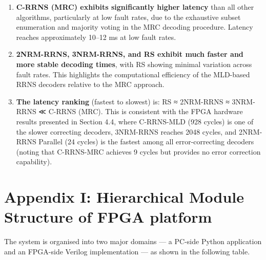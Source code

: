 \documentclass[
  english,
  12pt,
]{report}
\begin{document}
\begin{enumerate}
\def\labelenumi{\arabic{enumi}.}
\item
  \textbf{C-RRNS (MRC) exhibits significantly higher latency} than all
  other algorithms, particularly at low fault rates, due to the
  exhaustive subset enumeration and majority voting in the MRC decoding
  procedure. Latency reaches approximately 10--12 ms at low fault rates.
\item
  \textbf{2NRM-RRNS, 3NRM-RRNS, and RS exhibit much faster and more
  stable decoding times}, with RS showing minimal variation across fault
  rates. This highlights the computational efficiency of the MLD-based
  RRNS decoders relative to the MRC approach.
\item
  \textbf{The latency ranking} (fastest to slowest) is: RS ≈ 2NRM-RRNS ≈
  3NRM-RRNS ≪ C-RRNS (MRC). This is consistent with the FPGA hardware
  results presented in Section 4.4, where C-RRNS-MLD (928 cycles) is one
  of the slower correcting decoders, 3NRM-RRNS reaches 2048 cycles, and
  2NRM-RRNS Parallel (24 cycles) is the fastest among all
  error-correcting decoders (noting that C-RRNS-MRC achieves 9 cycles
  but provides no error correction capability).
\end{enumerate}

\section{Appendix I: Hierarchical Module Structure of FPGA
platform}\label{appendix-i-hierarchical-module-structure-of-fpga-platform}

The system is organised into two major domains --- a PC-side Python
application and an FPGA-side Verilog implementation --- as shown in the
following table.
\end{document}
